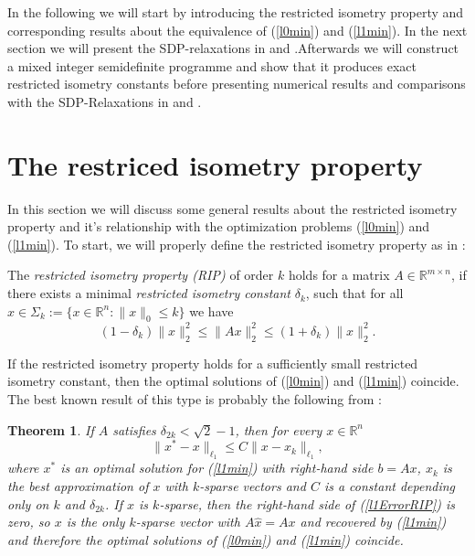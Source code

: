 \documentclass[a4paper,11pt,1p]{elsarticle}
\newtheorem{thm}{Theorem}
\newcommand{\R}{\mathds{R}}
\begin{document}
In the following we will start by introducing the restricted isometry property and corresponding results about the equivalence of (\ref{l0min}) and (\ref{l1min}). In the next section we will present the SDP-relaxations in \cite{Asp07} 
and \cite{Asp08}.Afterwards we will construct a mixed integer semidefinite programme and show that it produces exact restricted isometry constants before presenting numerical results and comparisons with the SDP-Relaxations in 
\cite{Asp07} and \cite{Asp08}.

\section{The restriced isometry property}

In this section we will discuss some general results about the restricted isometry property and it's relationship with the optimization problems (\ref{l0min}) and (\ref{l1min}). To start, we will properly define the restricted
isometry property as in \cite{CT05}:

\begin{rmk} \label{ripdef}
The \emph{restricted isometry property (RIP)} of order $k$ holds for a matrix $A \in \R^{m \times n}$, if there exists a minimal \emph{restricted isometry constant} $\delta_k$, such that for all $x \in \Sigma_k := 
\{x \in \R^n : \|x\|_0 \leq k \}$ we have
 \begin{equation}\label{rip}
  (1-\delta_k)\|x\|_2^2 \leq \|Ax\|_2^2 \leq (1+\delta_k)\|x\|_2^2.
 \end{equation}
 \end{rmk}
 
 If the restricted isometry property holds for a sufficiently small restricted isometry constant, then the optimal solutions of (\ref{l0min}) and (\ref{l1min}) coincide. The best known result of this type is probably the following from
 \cite{Can08}:
 
\begin{thm} \label{RIPsqrt2}
 If $A$ satisfies $\delta_{2k} < \sqrt{2}-1$, then for every $x \in \R^n$
 \begin{equation*}\label{l1ErrorRIP}
  \|x^* - x \|_{\ell_1} \leq C \|x - x_k \|_{\ell_1},
 \end{equation*}
where $x^*$ is an optimal solution for (\ref{l1min}) with right-hand side $b = Ax$, $x_k$ is the best approximation of $x$ with $k$-sparse vectors and $C$ is a constant depending only on $k$ and $\delta_{2k}$. If $x$ is $k$-sparse, then the right-hand side of
(\ref{l1ErrorRIP}) is zero, so $x$ is the only $k$-sparse vector with $A\hat{x} = Ax$ and recovered by (\ref{l1min}) and therefore the optimal solutions of (\ref{l0min}) and (\ref{l1min}) coincide.\end{thm}
\end{document}
